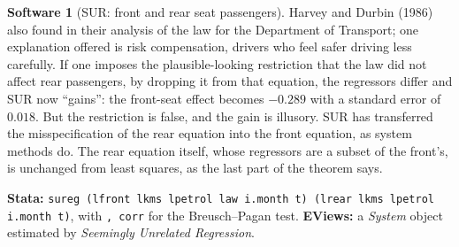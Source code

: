 \documentclass[11pt,a4paper]{article}
\numberwithin{equation}{section}
\theoremstyle{definition}
\newtheorem{software}[thm]{Software}
\begin{document}
\begin{software}[SUR: front and rear seat passengers]
Harvey and Durbin (1986) also found in their analysis of the law for the Department of Transport; one explanation offered is risk compensation, drivers
who feel safer driving less carefully. If one imposes the plausible-looking restriction that the law did not affect rear passengers, by dropping it from that equation,
the regressors differ and SUR now ``gains'': the front-seat effect becomes $-0.289$ with a standard error of $0.018$. But the restriction is false, and the
gain is illusory. SUR has transferred the misspecification of the rear equation into the front equation, as system methods do. The rear equation itself,
whose regressors are a subset of the front's, is unchanged from least squares, as the last part of the theorem says.

\textbf{Stata:} \texttt{sureg (lfront lkms lpetrol law i.month t) (lrear lkms lpetrol i.month t)}, with \texttt{, corr} for the Breusch--Pagan test.
\textbf{EViews:} a \emph{System} object estimated by \emph{Seemingly Unrelated Regression}.
\end{software}
\end{document}
